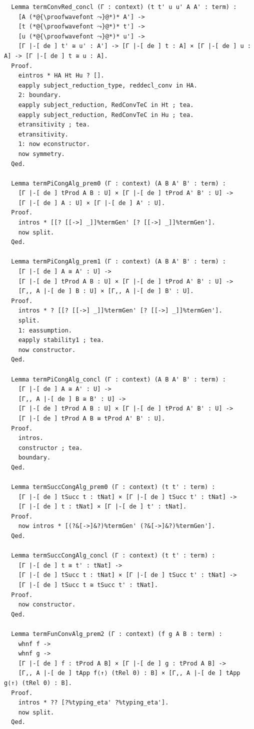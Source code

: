 \begin{lstlisting}
  Lemma termConvRed_concl (Γ : context) (t t' u u' A A' : term) :
    [A (*@{\proofwavefont ⤳}@*)* A'] ->
    [t (*@{\proofwavefont ⤳}@*)* t'] ->
    [u (*@{\proofwavefont ⤳}@*)* u'] ->
    [Γ |-[ de ] t' ≅ u' : A'] -> [Γ |-[ de ] t : A] × [Γ |-[ de ] u : A] -> [Γ |-[ de ] t ≅ u : A].
  Proof.
    eintros * HA Ht Hu ? [].
    eapply subject_reduction_type, reddecl_conv in HA.
    2: boundary.
    eapply subject_reduction, RedConvTeC in Ht ; tea.
    eapply subject_reduction, RedConvTeC in Hu ; tea.
    etransitivity ; tea.
    etransitivity.
    1: now econstructor.
    now symmetry.
  Qed.

  Lemma termPiCongAlg_prem0 (Γ : context) (A B A' B' : term) :
    [Γ |-[ de ] tProd A B : U] × [Γ |-[ de ] tProd A' B' : U] ->
    [Γ |-[ de ] A : U] × [Γ |-[ de ] A' : U].
  Proof.
    intros * [[? [[->] _]]%termGen' [? [[->] _]]%termGen'].
    now split.
  Qed.

  Lemma termPiCongAlg_prem1 (Γ : context) (A B A' B' : term) :
    [Γ |-[ de ] A ≅ A' : U] ->
    [Γ |-[ de ] tProd A B : U] × [Γ |-[ de ] tProd A' B' : U] ->
    [Γ,, A |-[ de ] B : U] × [Γ,, A |-[ de ] B' : U].
  Proof.
    intros * ? [[? [[->] _]]%termGen' [? [[->] _]]%termGen'].
    split.
    1: eassumption.
    eapply stability1 ; tea.
    now constructor.
  Qed.

  Lemma termPiCongAlg_concl (Γ : context) (A B A' B' : term) :
    [Γ |-[ de ] A ≅ A' : U] ->
    [Γ,, A |-[ de ] B ≅ B' : U] ->
    [Γ |-[ de ] tProd A B : U] × [Γ |-[ de ] tProd A' B' : U] ->
    [Γ |-[ de ] tProd A B ≅ tProd A' B' : U].
  Proof.
    intros.
    constructor ; tea.
    boundary.
  Qed.

  Lemma termSuccCongAlg_prem0 (Γ : context) (t t' : term) :
    [Γ |-[ de ] tSucc t : tNat] × [Γ |-[ de ] tSucc t' : tNat] ->
    [Γ |-[ de ] t : tNat] × [Γ |-[ de ] t' : tNat].
  Proof.
    now intros * [(?&[->]&?)%termGen' (?&[->]&?)%termGen'].
  Qed.
  
  Lemma termSuccCongAlg_concl (Γ : context) (t t' : term) :
    [Γ |-[ de ] t ≅ t' : tNat] ->
    [Γ |-[ de ] tSucc t : tNat] × [Γ |-[ de ] tSucc t' : tNat] ->
    [Γ |-[ de ] tSucc t ≅ tSucc t' : tNat].
  Proof.
    now constructor.
  Qed.

  Lemma termFunConvAlg_prem2 (Γ : context) (f g A B : term) :
    whnf f ->
    whnf g ->
    [Γ |-[ de ] f : tProd A B] × [Γ |-[ de ] g : tProd A B] ->
    [Γ,, A |-[ de ] tApp f⟨↑⟩ (tRel 0) : B] × [Γ,, A |-[ de ] tApp g⟨↑⟩ (tRel 0) : B].
  Proof.
    intros * ?? [?%typing_eta' ?%typing_eta'].
    now split.
  Qed.


\end{lstlisting}
